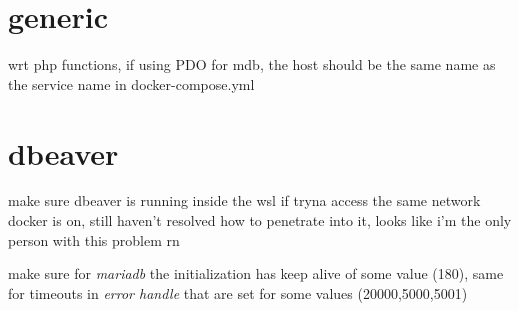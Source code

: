\section{generic}%
\label{sec:generic}

wrt php functions, if using PDO for mdb, the host should be the same name as the service name in docker-compose.yml


\section{dbeaver}%
\label{sec:dbeaver}

make sure dbeaver is running inside the wsl if tryna access the same network docker is on, still haven't resolved how to penetrate into it, looks like i'm the only person with this problem rn

make sure for \textit{mariadb} the initialization has keep alive of some value (180), same for timeouts in \textit{error handle} that are set for some values (20000,5000,5001)

